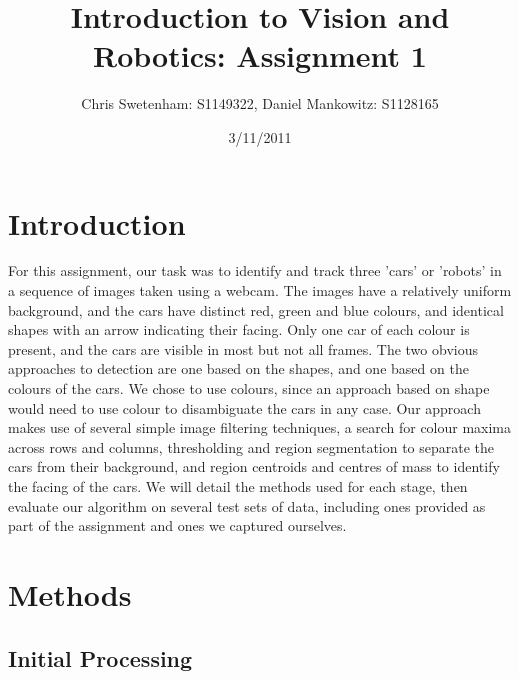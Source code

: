 \documentclass{article}
\title{Introduction to Vision and Robotics: Assignment 1}
\author{Chris Swetenham: S1149322, Daniel Mankowitz: S1128165}
\date{3/11/2011}
\begin{document}
\maketitle

\section{Introduction}
\label{sec:introduction}
For this assignment, our task was to identify and track three 'cars' or 'robots' in a sequence of images taken using a webcam. The images have a relatively uniform background, and the cars have distinct red, green and blue colours, and identical shapes with an arrow indicating their facing. Only one car of each colour is present, and the cars are visible in most but not all frames.
The two obvious approaches to detection are one based on the shapes, and one based on the colours of the cars. We chose to use colours, since an approach based on shape would need to use colour to disambiguate the cars in any case.
Our approach makes use of several simple image filtering techniques, a search for colour maxima across rows and columns, thresholding and region segmentation to separate the cars from their background, and region centroids and centres of mass to identify the facing of the cars.
We will detail the methods used for each stage, then evaluate our algorithm on several test sets of data, including ones provided as part of the assignment and ones we captured ourselves.

\section{Methods}
\label{sec:methods}





\subsection{Initial Processing}
\label{sec:processing}
\end{document}
